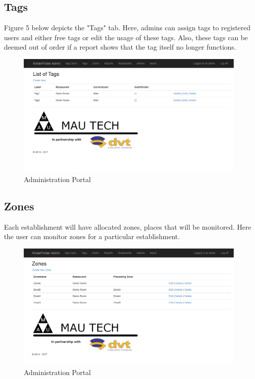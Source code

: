 \documentclass{article}
\begin{document}
\subsection{Tags}
Figure 5 below depicts the "Tags" tab. Here, admins can assign tags to registered users and either free tags or edit the usage of these tags. Also, these tags can be deemed out of order if a report shows that the tag itself no longer functions.
\begin{figure}[H]
\centering
\includegraphics[scale=0.4]{tags.png}
\caption{Administration Portal}
\end{figure}

\subsection{Zones}
Each establishment will have allocated zones, places that will be monitored. Here the user can monitor zones for a particular establishment.
\begin{figure}[H]
\centering
\includegraphics[scale=0.4]{zones.png}
\caption{Administration Portal}
\end{figure}
\end{document}
